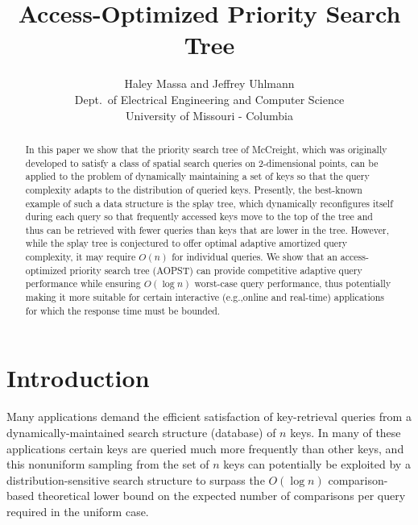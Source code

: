 \documentclass{article}
\title{\bf Access-Optimized Priority Search Tree}
\author{\Large {Haley Massa} and {Jeffrey Uhlmann} \\
Dept.\ of Electrical Engineering and Computer Science\\
University of Missouri - Columbia}
\date{}
\begin{document}
\maketitle

\begin{abstract}
In this paper we show that the priority search tree of McCreight, which was originally developed to satisfy a class of spatial search queries on 2-dimensional points, can be applied to the problem of dynamically maintaining a set of keys so that the query complexity adapts to the distribution of queried keys. Presently, the best-known example of such a data structure is the splay tree, which dynamically reconfigures itself during each query so that frequently accessed keys move to the top of the tree and thus can be retrieved with fewer queries than keys that are lower in the tree. However, while the splay tree is conjectured to offer optimal adaptive amortized query complexity, it may require $O(n)$ for individual queries. We show that an access-optimized priority search tree (AOPST) can provide competitive adaptive query performance while ensuring $O(\log n)$ worst-case query performance, thus potentially making it more suitable for certain interactive (e.g.,online and real-time) applications for which the response time must be bounded.  
\end{abstract}

\section{Introduction}

Many applications demand the efficient satisfaction of key-retrieval queries from a dynamically-maintained search structure (database) of $n$ keys. In many of these applications certain keys are queried much more frequently than other keys, and this nonuniform sampling from the set of $n$ keys can potentially be exploited by a distribution-sensitive search structure to surpass the $O(\log n)$ comparison-based theoretical lower bound on the expected number of comparisons per query required in the uniform case. 
\end{document}
